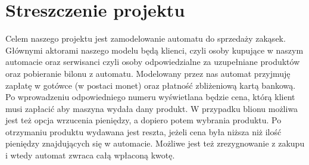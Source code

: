 \documentclass[11pt]{article}
\begin{document}
	\tableofcontents
	\cleardoublepage
	\setcounter{page}{2}
	
	\section{Streszczenie projektu}
		Celem naszego projektu jest zamodelowanie automatu do sprzedaży zakąsek. Głównymi aktorami naszego modelu będą klienci, czyli osoby kupujące w naszym automacie oraz serwisanci czyli osoby odpowiedzialne za uzupełniane produktów oraz pobieranie bilonu z automatu. Modelowany przez nas automat przyjmuję zapłatę w gotówce (w postaci monet) oraz płatność zbliżeniową kartą bankową. Po wprowadzeniu odpowiedniego numeru wyświetlana będzie cena, którą klient musi zapłacić aby maszyna wydała dany produkt. W przypadku blionu możliwa jest też opcja wrzucenia pieniędzy, a dopiero potem wybrania produktu. Po otrzymaniu produktu wydawana jest reszta, jeżeli cena była niższa niż ilość pieniędzy znajdujących się w automacie. Możliwe jest też zrezygnowanie z zakupu i wtedy automat zwraca całą wpłaconą kwotę.
	
\end{document}
